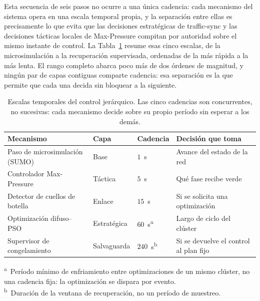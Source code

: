 Esta secuencia de seis pasos no ocurre a una única cadencia: cada mecanismo del sistema opera en una escala temporal propia, y la separación entre ellas es precisamente lo que evita que las decisiones estratégicas de traffic-sync y las decisiones tácticas locales de Max-Pressure compitan por autoridad sobre el mismo instante de control. La Tabla~\ref{tab:escalas_temporales} resume esas cinco escalas, de la microsimulación a la recuperación supervisada, ordenadas de la más rápida a la más lenta. El rango completo abarca poco más de dos órdenes de magnitud, y ningún par de capas contiguas comparte cadencia: esa separación es la que permite que cada una decida sin bloquear a la siguiente.

\begin{table}[htbp]
\centering
\caption{Escalas temporales del control jerárquico. Las cinco cadencias son concurrentes, no sucesivas: cada mecanismo decide sobre su propio período sin esperar a los demás.}
\label{tab:escalas_temporales}
\footnotesize
\begin{tabular}{llll}
\toprule
\textbf{Mecanismo} & \textbf{Capa} & \textbf{Cadencia} & \textbf{Decisión que toma} \\
\midrule
Paso de microsimulación (SUMO) & Base         & $1$~s   & Avance del estado de la red \\
Controlador Max-Pressure       & Táctica      & $5$~s   & Qué fase recibe verde \\
Detector de cuellos de botella & Enlace       & $15$~s  & Si se solicita una optimización \\
Optimización difuso--PSO       & Estratégica  & $60$~s\textsuperscript{a} & Largo de ciclo del clúster \\
Supervisor de congelamiento    & Salvaguarda  & $240$~s\textsuperscript{b} & Si se devuelve el control al plan fijo \\
\bottomrule
\end{tabular}

\vspace{0.2cm}
{\footnotesize\raggedright
\textsuperscript{a}~Período mínimo de enfriamiento entre optimizaciones de un mismo clúster, no una cadencia fija: la optimización se dispara por evento.\\
\textsuperscript{b}~Duración de la ventana de recuperación, no un período de muestreo.\par}
\end{table}

